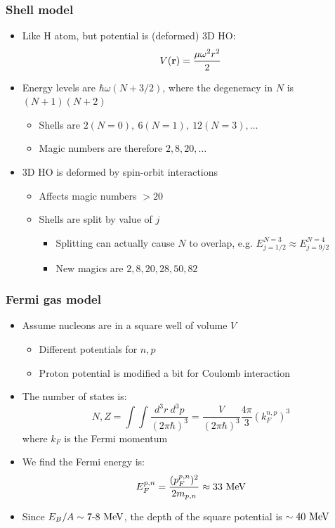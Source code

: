 \subsubsection{Shell model}
\begin{itemize}
  \item Like H atom, but potential is (deformed) 3D HO:
  \begin{equation}
    V(\mathbf{r}) = \frac{\mu \omega^2 r^2}{2}
  \end{equation}
  \item Energy levels are $\hbar\omega(N + 3/2)$, where the degeneracy in $N$ is $(N+1)(N+2)$
  \begin{itemize}
    \item Shells are $2(N=0),~6(N=1),~12(N=3),\dots$
    \item Magic numbers are therefore $2,8,20,\dots$
  \end{itemize}
  \item 3D HO is deformed by spin-orbit interactions
  \begin{itemize}
    \item Affects magic numbers $>20$
    \item Shells are split by value of $j$
    \begin{itemize}
      \item Splitting can actually cause $N$ to overlap, e.g. $E_{j=1/2}^{N=3} \approx E_{j=9/2}^{N=4}$
      \item New magics are $2,8,20,28,50,82$
    \end{itemize}
  \end{itemize}
\end{itemize}

\subsubsection{Fermi gas model}
\begin{itemize}
  \item Assume nucleons are in a square well of volume $V$
  \begin{itemize}
    \item Different potentials for $n,p$
    \item Proton potential is modified a bit for Coulomb interaction
  \end{itemize}
  \item The number of states is:
    \begin{equation}
      N,Z = \int \int \frac{d^3r~d^3p}{(2\pi\hbar)^3} = \frac{V}{(2\pi\hbar)^3} \frac{4\pi}{3} \left(k_F^{n,p}\right)^3
    \end{equation}
    where $k_F$ is the Fermi momentum
    \item We find the Fermi energy is:
    \begin{equation}
      E_F^{p,n} = \frac{(p_F^{p,n})^2}{2 m_{p,n}} \approx 33~\text{MeV}
    \end{equation}
    \item Since $E_B/A \sim 7\textto8~\mev$, the depth of the square potential is $\sim40~\text{MeV}$
\end{itemize}

